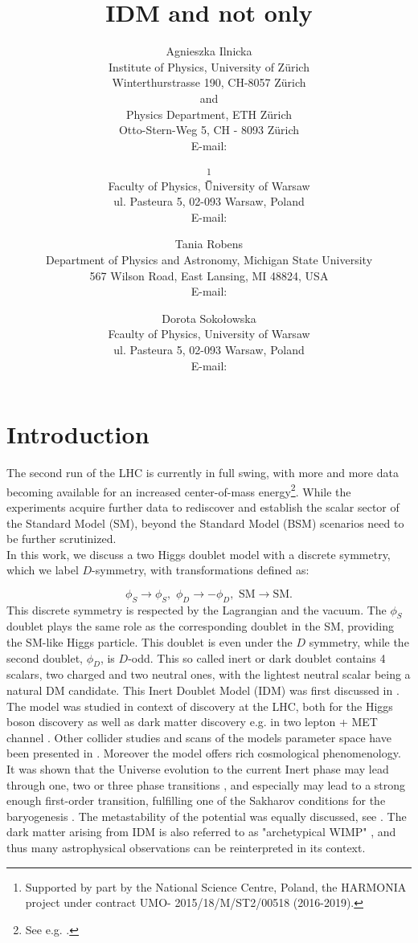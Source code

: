 \documentclass{PoS}
\title{IDM and not only}
\author{Agnieszka Ilnicka\\
        Institute of Physics, University of Z\"urich \\
Winterthurstrasse 190, CH-8057 Z\"urich\\and\\
Physics Department, ETH Z\"urich \\
Otto-Stern-Weg 5, CH - 8093 Z\"urich\\
        E-mail: \email{ailnicka@physik.uzh.ch}}
\author{
\speaker{Maria Krawczyk}\thanks{Supported by part by the National Science Centre, Poland, the HARMONIA project under contract UMO-
2015/18/M/ST2/00518 (2016-2019).}\\
         Faculty of Physics, University of Warsaw\\ ul. Pasteura 5, 02-093 Warsaw, Poland\\
        E-mail: \email{krawczyk@fuw.edu.pl}}
\author{Tania Robens\\
Department of Physics and Astronomy, Michigan State University\\
567 Wilson Road,
East Lansing, MI 48824,
USA\\
E-mail: \email{robens@pa.msu.edu}}
\author{Dorota Soko\l owska \\
 Fcaulty of Physics, University of Warsaw\\  ul. Pasteura 5, 02-093 Warsaw, Poland\\
        E-mail: \email{Dorota.Sokolowska@fuw.edu.pl}
}
\begin{document}
\section{Introduction}
The second run of the LHC is currently in full swing, with more and more data becoming available for an increased center-of-mass energy\footnote{See e.g. \cite{moriond}.}. While the experiments acquire further data to rediscover and establish the scalar sector of the Standard Model {(SM)}, beyond the Standard Model (BSM) scenarios need to be further scrutinized.\\
In this work, we discuss a two Higgs doublet model with a discrete symmetry, which we label $ D$-symmetry,   {with} transformations defined as:

\begin{equation}
\phi_S\to \phi_S, \,\, \phi_D \to - \phi_D, \,\,
\text{SM} \to \text{SM}.
\end{equation}
{This discrete symmetry} 
 is respected by the Lagrangian 
and  the vacuum. The $\phi_S$ doublet plays the same role as the corresponding  doublet in the SM, {providing} the SM-like Higgs particle. This doublet is even under the $D$ symmetry, while the second doublet, $\phi_D$, is $D$-odd. This so called inert or dark doublet contains 4 scalars, two charged and two neutral ones, with the lightest neutral scalar being a natural DM candidate.
This Inert Doublet Model (IDM) was first discussed in \cite{Deshpande:1977rw,Cao:2007rm,Barbieri:2006dq}.  {The model} was studied in context of discovery  {at the} LHC, both for the Higgs boson discovery \cite{Barbieri:2006dq,Cao:2007rm} as well as dark matter discovery e.g. in two lepton + MET channel \cite{Dolle:2009ft,Gustafsson:2012aj}.  Other collider studies and scans of the models parameter space have been presented in \cite{Blinov:2015qva,Ferreira:2015pfi,Diaz:2015pyv,Hashemi:2015swh,Krawczyk:2015xhl,Poulose:2016lvz,Kanemura:2016sos,Datta:2016nfz,deFlorian:2016spz,Hashemi:2016wup,Belyaev:2016lok}. Moreover the model offers rich cosmological phenomenology. {It was {shown} that} the Universe evolution to the current Inert phase may lead through one, two or three phase transitions \cite{Ginzburg:2010wa}, and especially may lead to a {strong enough}  first-order transition, fulfilling one of the Sakharov conditions for the baryogenesis \cite{Hambye:2007vf,Chowdhury:2011ga,Gil:2012ya}. {T}he metastability of the potential was {equally} discussed, {see} \cite{Goudelis:2013uca,Swiezewska:2015paa,Khan:2015ipa}. The dark matter arising from IDM is also referred to as "archetypical WIMP" \cite{LopezHonorez:2006gr}, and thus many astrophysical observations {can be} reinterpreted in its context. 
\end{document}
